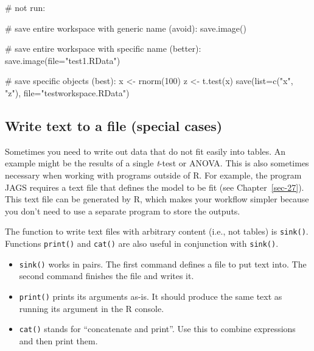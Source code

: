 \documentclass[
  13,
  letterpaper,
]{report}
\newenvironment{Shaded}{\begin{snugshade}}{\end{snugshade}}
\newcommand{\AttributeTok}[1]{\textcolor[rgb]{0.40,0.45,0.13}{#1}}
\newcommand{\CommentTok}[1]{\textcolor[rgb]{0.37,0.37,0.37}{#1}}
\newcommand{\DecValTok}[1]{\textcolor[rgb]{0.68,0.00,0.00}{#1}}
\newcommand{\FunctionTok}[1]{\textcolor[rgb]{0.28,0.35,0.67}{#1}}
\newcommand{\NormalTok}[1]{\textcolor[rgb]{0.00,0.23,0.31}{#1}}
\newcommand{\OtherTok}[1]{\textcolor[rgb]{0.00,0.23,0.31}{#1}}
\newcommand{\StringTok}[1]{\textcolor[rgb]{0.13,0.47,0.30}{#1}}
\begin{document}
\begin{Shaded}
\begin{Highlighting}[]
\CommentTok{\# not run:}

\CommentTok{\# save entire workspace with generic name (avoid):}
\FunctionTok{save.image}\NormalTok{()}

\CommentTok{\# save entire workspace with specific name (better):}
\FunctionTok{save.image}\NormalTok{(}\AttributeTok{file=}\StringTok{"test1.RData"}\NormalTok{)}

\CommentTok{\# save specific objects (best):}
\NormalTok{x }\OtherTok{\textless{}{-}} \FunctionTok{rnorm}\NormalTok{(}\DecValTok{100}\NormalTok{)}
\NormalTok{z }\OtherTok{\textless{}{-}} \FunctionTok{t.test}\NormalTok{(x)}
\FunctionTok{save}\NormalTok{(}\AttributeTok{list=}\FunctionTok{c}\NormalTok{(}\StringTok{"x"}\NormalTok{, }\StringTok{"z"}\NormalTok{), }\AttributeTok{file=}\StringTok{"testworkspace.RData"}\NormalTok{)}
\end{Highlighting}
\end{Shaded}

\subsection{Write text to a file (special
cases)}\label{sec-04-export-sink}

Sometimes you need to write out data that do not fit easily into tables.
An example might be the results of a single \emph{t}-test or ANOVA. This
is also sometimes necessary when working with programs outside of R. For
example, the program JAGS requires a text file that defines the model to
be fit (see Chapter~\ref{sec-27}). This text file can be generated by R,
which makes your workflow simpler because you don't need to use a
separate program to store the outputs.

The function to write text files with arbitrary content (i.e., not
tables) is \texttt{sink()}. Functions \texttt{print()} and
\texttt{cat()} are also useful in conjunction with \texttt{sink()}.

\begin{itemize}
\item
  \texttt{sink()} works in pairs. The first command defines a file to
  put text into. The second command finishes the file and writes it.
\item
  \texttt{print()} prints its arguments as-is. It should produce the
  same text as running its argument in the R console.
\item
  \texttt{cat()} stands for ``concatenate and print''. Use this to
  combine expressions and then print them.
\end{itemize}
\end{document}
